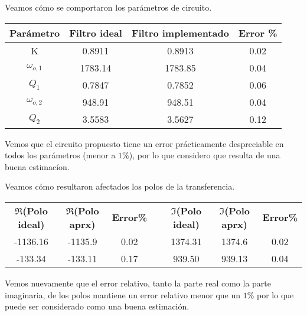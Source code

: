 Veamos cómo se comportaron los parámetros de circuito.

\begin{table}[!h]
\centering
\begin{tabular}{|c|c|c|c|}
\hline
\textbf{Parámetro} & \textbf{Filtro ideal} & \textbf{Filtro implementado} & \textbf{Error \%} \\ \hline
K                  & 0.8911                & 0.8913                       & 0.02                       \\ \hline
$\omega_{o,1}$     & 1783.14               & 1783.85                      & 0.04                       \\ \hline
$Q_{1}$            & 0.7847                & 0.7852                       & 0.06                       \\ \hline
$\omega_{o,2}$     & 948.91                & 948.51                       & 0.04                       \\ \hline
$Q_{2}$            & 3.5583                & 3.5627                       & 0.12                        \\ \hline
\end{tabular}
\end{table}

Vemos que el circuito propuesto tiene un error prácticamente despreciable en todos los parámetros (menor a $1\%$), por lo que considero que resulta de una buena estimacíon.

Veamos cómo resultaron afectados los polos de la transferencia.

\begin{table}[!h]
\centering
\begin{tabular}{|c|c|c|c|c|c|c|}
\cline{1-3} \cline{5-7}
\textbf{$\Re$(Polo ideal)} & \textbf{$\Re$(Polo aprx)} & \textbf{Error\%} &  & \textbf{$\Im$(Polo ideal)} & \textbf{$\Im$(Polo aprx)} & \textbf{Error\%} \\ \cline{1-3} \cline{5-7} 
-1136.16                   & -1135.9                   & 0.02             &  & 1374.31                    & 1374.6                    & 0.02             \\ \cline{1-3} \cline{5-7} 
-133.34                    & -133.11                   & 0.17             &  & 939.50                     & 939.13                    & 0.04             \\ \cline{1-3} \cline{5-7} 
\end{tabular}
\end{table}

Vemos nuevamente que el error relativo, tanto la parte real como la parte imaginaria, de los polos mantiene un error relativo menor que un $1 \%$ por lo que puede ser considerado como una buena estimación.